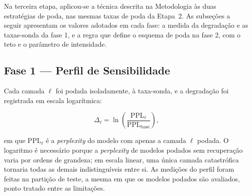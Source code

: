 Na terceira etapa, aplicou-se a técnica descrita na Metodologia
às duas estratégias de poda, nas mesmas taxas de poda da Etapa~2.
As subseções a seguir apresentam os valores adotados em cada
fase: a medida da degradação e as taxas-sonda da fase 1, e a regra que define o esquema de
poda na fase 2, com o teto e o parâmetro de intensidade.

\subsection{Fase 1 --- Perfil de Sensibilidade}\label{subsec:fase1}

Cada camada $\ell$ foi podada isoladamente, à taxa-sonda, e a degradação foi registrada em
escala logarítmica:

\begin{equation}\label{eq:delta_perfil}
\Delta_{\ell} = \ln\!\left(\frac{\text{PPL}_{\ell}}{\text{PPL}_{\text{base}}}\right),
\end{equation}

\noindent em que $\text{PPL}_{\ell}$ é a \textit{perplexity} do modelo com apenas a camada
$\ell$ podada. O logaritmo é necessário porque a \textit{perplexity} de modelos podados sem
recuperação varia por ordens de grandeza; em escala linear, uma única camada catastrófica
tornaria todas as demais indistinguíveis entre si. As medições do perfil foram feitas na
partição de teste, a mesma em que os modelos podados são avaliados,
ponto tratado entre as limitações.

